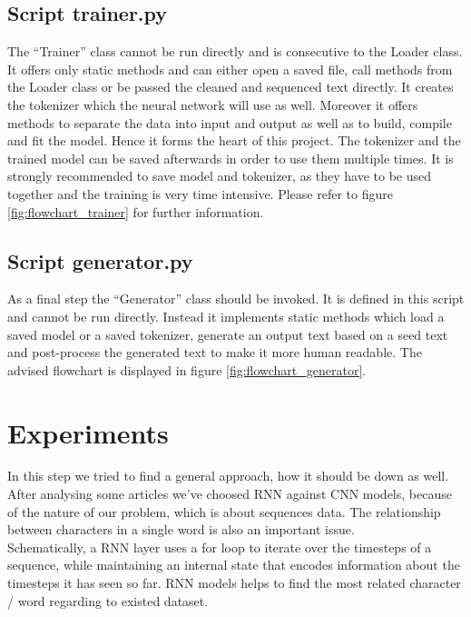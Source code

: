 \documentclass[conference]{IEEEtran}
\begin{document}
\subsection{Script trainer.py}\label{subsec_trainer}

The ``Trainer'' class cannot be run directly and is consecutive to the Loader class. It offers only static methods and can either open a saved file, call methods from the Loader class or be passed the cleaned and sequenced text directly. It creates the tokenizer which the neural network will use as well. Moreover it offers methods to separate the data into input and output as well as to build, compile and fit the model. Hence it forms the heart of this project. The tokenizer and the trained model can be saved afterwards in order to use them multiple times. It is strongly recommended to save model and tokenizer, as they have to be used together and the training is very time intensive. Please refer to figure \ref{fig:flowchart_trainer} for further information.


\subsection{Script generator.py}\label{subsec_generator}

As a final step the ``Generator'' class should be invoked. It is defined in this script and cannot be run directly. Instead it implements static methods which load a saved model or a saved tokenizer, generate an output text based on a seed text and post-process the generated text to make it more human readable. The advised flowchart is displayed in figure \ref{fig:flowchart_generator}.


\section{Experiments}

In this step we tried to find a general approach, how it should be down as well. After analysing some articles we’ve choosed RNN against CNN models, because of the nature of our problem, which is about sequences data. The relationship between characters in a single word is also an important issue.\\
Schematically, a RNN layer uses a for loop to iterate over the timesteps of a sequence, while maintaining an internal state that encodes information about the timesteps it has seen so far. RNN models helps to find the most related character / word regarding to existed dataset.
\end{document}
